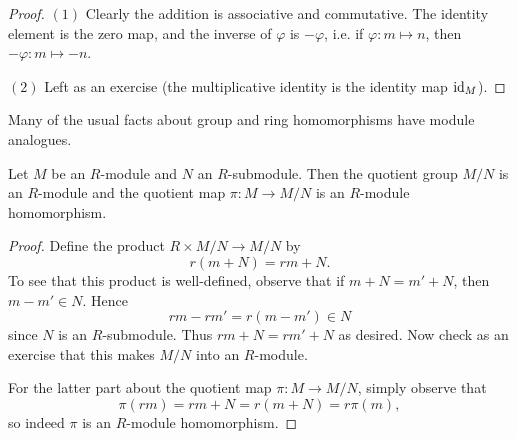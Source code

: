 \begin{proof}
  $(1)$ Clearly the addition is associative and
  commutative. The identity element is the zero map,
  and the inverse of $\varphi$ is $- \varphi$, i.e.
  if $\varphi : m \mapsto n$, then $- \varphi : m \mapsto -n$.
  
  $(2)$ Left as an exercise (the multiplicative
  identity is the identity map $\mathrm{id}_M$).
\end{proof}

\begin{remark}
  Many of the usual facts about group and ring
  homomorphisms have module analogues.
\end{remark}

\begin{prop}
  Let $M$ be an $R$-module and $N$ an $R$-submodule.
  Then the quotient group
  $M / N$ is an $R$-module and the quotient map
  $\pi : M \to M / N$ is an $R$-module homomorphism.
\end{prop}

\begin{proof}
  Define the product $R \times M / N \to M / N$ by
  \[
    r(m + N) = rm + N.
  \]
  To see that this product is well-defined, observe that
  if $m + N = m' + N$, then $m - m' \in N$. Hence
  \[
    rm - rm' = r(m - m') \in N
  \]
  since $N$ is an $R$-submodule. Thus
  $rm + N = rm' + N$ as desired. Now check as an exercise
  that this makes $M / N$ into an $R$-module.

  For the latter part about the quotient map
  $\pi : M \to M / N$, simply observe that
  \[
    \pi(rm) = rm + N = r(m + N) = r \pi(m),
  \]
  so indeed $\pi$ is an $R$-module homomorphism.
\end{proof}
